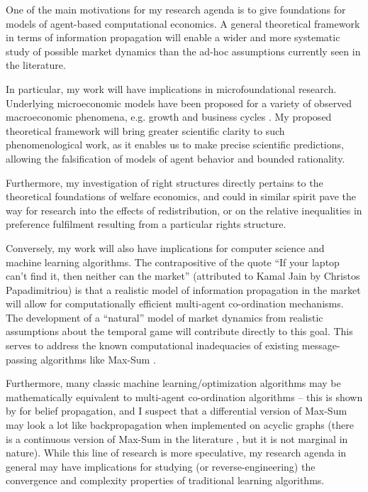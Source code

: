 \documentclass{article}
\begin{document}
One of the main motivations for my research agenda is to give foundations for models of agent-based computational economics. A general theoretical framework in terms of information propagation will enable a wider and more systematic study of possible market dynamics than the ad-hoc assumptions currently seen in the literature. 

In particular, my work will have implications in microfoundational research. Underlying microeconomic models have been proposed for a variety of observed macroeconomic phenomena, e.g. growth \cite{growth} and business cycles \cite{cycles}. My proposed theoretical framework will bring greater scientific clarity to such phenomenological work, as it enables us to make precise scientific predictions, allowing the falsification of models of agent behavior and bounded rationality.

Furthermore, my investigation of right structures directly pertains to the theoretical foundations of welfare economics, and could in similar spirit pave the way for research into the effects of redistribution, or on the relative inequalities in preference fulfilment resulting from a particular rights structure.

Conversely, my work will also have implications for computer science and machine learning algorithms. The contrapositive of the quote ``If your laptop can't find it, then neither can the market'' (attributed to Kamal Jain by Christos Papadimitriou) is that a realistic model of information propagation in the market will allow for computationally efficient multi-agent co-ordination mechanisms. The development of a ``natural'' model of market dynamics from realistic assumptions about the temporal game will contribute directly to this goal. This serves to address the known computational inadequacies of existing message-passing algorithms like Max-Sum \cite{khan}. 

Furthermore, many classic machine learning/optimization algorithms may be mathematically equivalent to multi-agent co-ordination algorithms -- this is shown by \cite{bayati1, bayati2, bayati3} for belief propagation, and I suspect that a differential version of Max-Sum may look a lot like backpropagation when implemented on acyclic graphs (there is a continuous version of Max-Sum in the literature \cite{soton}, but it is not marginal in nature).%
While this line of research is more speculative, my research agenda in general may have implications for studying (or reverse-engineering) the convergence and complexity properties of traditional learning algorithms.
\end{document}

